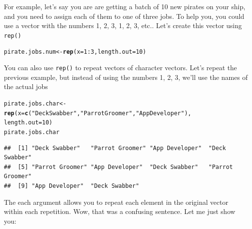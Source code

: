 \documentclass{tufte-book}\usepackage[]{graphicx}\usepackage[]{color}
\makeatletter
\newcommand{\hlnum}[1]{\textcolor[rgb]{0.686,0.059,0.569}{#1}}%
\newcommand{\hlstr}[1]{\textcolor[rgb]{0.192,0.494,0.8}{#1}}%
\newcommand{\hlopt}[1]{\textcolor[rgb]{0,0,0}{#1}}%
\newcommand{\hlstd}[1]{\textcolor[rgb]{0.345,0.345,0.345}{#1}}%
\newcommand{\hlkwb}[1]{\textcolor[rgb]{0.69,0.353,0.396}{#1}}%
\newcommand{\hlkwc}[1]{\textcolor[rgb]{0.333,0.667,0.333}{#1}}%
\newcommand{\hlkwd}[1]{\textcolor[rgb]{0.737,0.353,0.396}{\textbf{#1}}}%
\newenvironment{kframe}{%
 \def\at@end@of@kframe{}%
 \ifinner\ifhmode%
  \def\at@end@of@kframe{\end{minipage}}%
  \begin{minipage}{\columnwidth}%
 \fi\fi%
 \def\FrameCommand##1{\hskip\@totalleftmargin \hskip-\fboxsep
 \colorbox{shadecolor}{##1}\hskip-\fboxsep
     \hskip-\linewidth \hskip-\@totalleftmargin \hskip\columnwidth}%
 \MakeFramed {\advance\hsize-\width
   \@totalleftmargin\z@ \linewidth\hsize
   \@setminipage}}%
 {\par\unskip\endMakeFramed%
 \at@end@of@kframe}
\newenvironment{knitrout}{}{} %
\makeatother
\begin{document}

For example, let's say you are are getting a batch of 10 new pirates on your ship, and you need to assign each of them to one of three jobs. To help you, you could use a vector with the numbers 1, 2, 3, 1, 2, 3, etc.. Let's create this vector using \texttt{rep()}


\begin{knitrout}
\color{fgcolor}\begin{kframe}
\begin{alltt}
\hlstd{pirate.jobs.num} \hlkwb{<-} \hlkwd{rep}\hlstd{(}\hlkwc{x} \hlstd{=} \hlnum{1}\hlopt{:}\hlnum{3}\hlstd{,} \hlkwc{length.out} \hlstd{=} \hlnum{10}\hlstd{)}
\end{alltt}
\end{kframe}
\end{knitrout}


You can also use \texttt{rep()} to repeat vectors of character vectors. Let's repeat the previous example, but instead of using the numbers 1, 2, 3, we'll use the names of the actual jobs

\begin{knitrout}
\color{fgcolor}\begin{kframe}
\begin{alltt}
\hlstd{pirate.jobs.char} \hlkwb{<-} \hlkwd{rep}\hlstd{(}\hlkwc{x} \hlstd{=} \hlkwd{c}\hlstd{(}\hlstr{"Deck Swabber"}\hlstd{,} \hlstr{"Parrot Groomer"}\hlstd{,} \hlstr{"App Developer"}\hlstd{),}
                        \hlkwc{length.out} \hlstd{=} \hlnum{10}\hlstd{)}
\hlstd{pirate.jobs.char}
\end{alltt}
\begin{verbatim}
##  [1] "Deck Swabber"   "Parrot Groomer" "App Developer"  "Deck Swabber"  
##  [5] "Parrot Groomer" "App Developer"  "Deck Swabber"   "Parrot Groomer"
##  [9] "App Developer"  "Deck Swabber"
\end{verbatim}
\end{kframe}
\end{knitrout}

The each argument allows you to repeat each element in the original vector within each repetition. Wow, that was a confusing sentence. Let me just show you:
\end{document}
